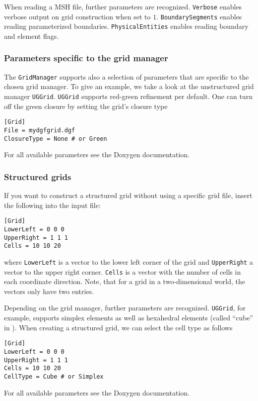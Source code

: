 When reading a MSH file, further parameters are recognized. \texttt{Verbose} enables verbose output on grid construction when set to $1$.
\texttt{BoundarySegments} enables reading parameterized boundaries. \texttt{PhysicalEntities} enables reading boundary and element flags.

\subsubsection{Parameters specific to the grid manager}
The \Dumux \texttt{GridManager} supports also a selection of parameters that are specific to the chosen grid manager.
To give an example, we take a look at the unstructured grid manager \texttt{UGGrid}.
\texttt{UGGrid} supports red-green refinement per default. One can turn off the green closure by setting the grid's closure type
\begin{lstlisting}[style=DumuxParameterFile]
[Grid]
File = mydgfgrid.dgf
ClosureType = None # or Green
\end{lstlisting}

For all available parameters see the Doxygen documentation.

\subsubsection{Structured grids}
If you want to construct a structured grid without using a specific grid file, insert the following into the input file:
\begin{lstlisting}[style=DumuxParameterFile]
[Grid]
LowerLeft = 0 0 0
UpperRight = 1 1 1
Cells = 10 10 20
\end{lstlisting}
where \texttt{LowerLeft} is a vector to the lower left corner of the grid and \texttt{UpperRight} a vector to the upper right corner.
\texttt{Cells} is a vector with the number of cells in each coordinate direction. Note,  that for a grid in a two-dimensional world, the
vectors only have two entries.

Depending on the grid manager, further parameters are recognized.
\texttt{UGGrid}, for example, supports simplex elements as well as hexahedral elements
(called ``cube'' in \Dune). When creating a structured grid, we can select the cell type as follows
\begin{lstlisting}[style=DumuxParameterFile]
[Grid]
LowerLeft = 0 0 0
UpperRight = 1 1 1
Cells = 10 10 20
CellType = Cube # or Simplex
\end{lstlisting}

For all available parameters see the Doxygen documentation.

